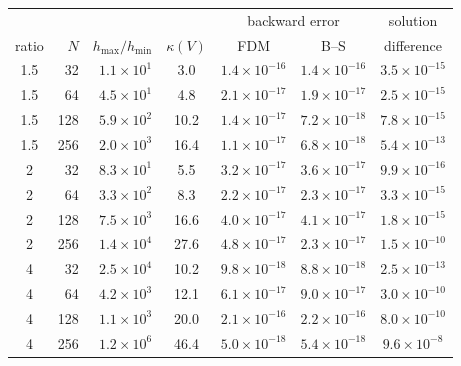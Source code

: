 \begin{tabular}{cr r c ccc}
\toprule
& & & & \multicolumn{2}{c}{backward error} & solution\\
ratio & $N$ & $h_{\max}/h_{\min}$ & $\kappa(V)$ & FDM & B--S & difference\\
\midrule
1.5 & 32 & $1.1{\times}10^{1}$ & 3.0 & $1.4{\times}10^{-16}$ & $1.4{\times}10^{-16}$ & $3.5{\times}10^{-15}$\\
1.5 & 64 & $4.5{\times}10^{1}$ & 4.8 & $2.1{\times}10^{-17}$ & $1.9{\times}10^{-17}$ & $2.5{\times}10^{-15}$\\
1.5 & 128 & $5.9{\times}10^{2}$ & 10.2 & $1.4{\times}10^{-17}$ & $7.2{\times}10^{-18}$ & $7.8{\times}10^{-15}$\\
1.5 & 256 & $2.0{\times}10^{3}$ & 16.4 & $1.1{\times}10^{-17}$ & $6.8{\times}10^{-18}$ & $5.4{\times}10^{-13}$\\
2 & 32 & $8.3{\times}10^{1}$ & 5.5 & $3.2{\times}10^{-17}$ & $3.6{\times}10^{-17}$ & $9.9{\times}10^{-16}$\\
2 & 64 & $3.3{\times}10^{2}$ & 8.3 & $2.2{\times}10^{-17}$ & $2.3{\times}10^{-17}$ & $3.3{\times}10^{-15}$\\
2 & 128 & $7.5{\times}10^{3}$ & 16.6 & $4.0{\times}10^{-17}$ & $4.1{\times}10^{-17}$ & $1.8{\times}10^{-15}$\\
2 & 256 & $1.4{\times}10^{4}$ & 27.6 & $4.8{\times}10^{-17}$ & $2.3{\times}10^{-17}$ & $1.5{\times}10^{-10}$\\
4 & 32 & $2.5{\times}10^{4}$ & 10.2 & $9.8{\times}10^{-18}$ & $8.8{\times}10^{-18}$ & $2.5{\times}10^{-13}$\\
4 & 64 & $4.2{\times}10^{3}$ & 12.1 & $6.1{\times}10^{-17}$ & $9.0{\times}10^{-17}$ & $3.0{\times}10^{-10}$\\
4 & 128 & $1.1{\times}10^{3}$ & 20.0 & $2.1{\times}10^{-16}$ & $2.2{\times}10^{-16}$ & $8.0{\times}10^{-10}$\\
4 & 256 & $1.2{\times}10^{6}$ & 46.4 & $5.0{\times}10^{-18}$ & $5.4{\times}10^{-18}$ & $9.6{\times}10^{-8}$\\
\bottomrule
\end{tabular}
